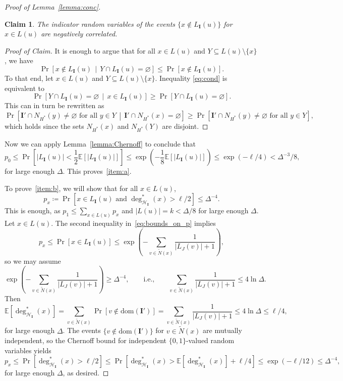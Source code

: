\documentclass[11pt, reqno, psamsfonts]{amsart}
\newtheorem*{claim*}{Claim}
\theoremstyle{definition}
\theoremstyle{remark}
\newcommand*{\myproofname}{Proof}
\newenvironment{claimproof}[1][\myproofname]{\begin{proof}[#1]\renewcommand*{\qedsymbol}{\(\dashv\)}}{\end{proof}}
\renewcommand{\qedsymbol}{$\blacksquare$}
\newcommand{\0}{\varnothing}
\newcommand{\set}[1]{\{#1\}}
\newcommand{\dom}{\mathrm{dom}}
\renewcommand{\tilde}{\widetilde}
\renewcommand{\leq}{\leqslant}
\renewcommand{\geq}{\geqslant}
\newcommand{\defeq}{\coloneqq}
\newcommand{\Cov}[1]{\mathscr{#1}}
\newcommand{\event}[1]{\{{#1}\}}
\renewcommand{\mathbf}[1]{{\bm{#1}}}
\numberwithin{equation}{section}
\begin{document}
\begin{proof}[Proof of Lemma~\ref{lemma:conc}]
	\begin{claim*}
		The indicator random variables of the events $\event{x \not\in L_\mathbf{I}(u)}$ for $x \in L(u)$ are negatively correlated.
	\end{claim*}
	\begin{claimproof}[Proof of Claim]
		It is enough to argue that for all $x \in L(u)$ and $Y \subseteq L(u) \setminus \set{x}$, we have
		\begin{equation}\label{eq:cond}
			\Pr\left[x \not\in L_\mathbf{I}(u) \, \middle\vert\, Y \cap L_\mathbf{I}(u) = \0\right] \leq \Pr\left[x \not\in L_\mathbf{I}(u)\right].
		\end{equation}
		To that end, let $x \in L(u)$ and $Y \subseteq L(u) \setminus \set{x}$. Inequality \eqref{eq:cond} is equivalent to
		\[
			\Pr\left[Y \cap L_\mathbf{I}(u) = \0 \, \middle\vert\, x \in L_\mathbf{I}(u) \right] \geq \Pr\left[Y \cap L_\mathbf{I}(u) = \0\right].
		\]
		This can in turn be rewritten as
		\[
			\Pr\left[\mathbf{I}' \cap N_{H^\ast}(y) \neq \0 \text{ for all } y \in Y \, \middle\vert\, \mathbf{I}' \cap N_{H^\ast}(x) = \0 \right] \geq \Pr\left[\mathbf{I}' \cap N_{H^\ast}(y) \neq \0 \text{ for all } y \in Y\right],
		\]
		which holds since the sets $N_{H^\ast}(x)$ and $N_{H^\ast}(Y)$ are disjoint.
	\end{claimproof}
	
	\noindent Now we can apply Lemma~\ref{lemma:Chernoff} to conclude that
	\[
		p_0  \leq \Pr\left[|L_\mathbf{I}(u)| < \frac{1}{2}\mathbb{E}\left[|L_\mathbf{I}(u)|\right]\right] \leq \exp\left(-\frac{1}{8}\mathbb{E}\left[|L_\mathbf{I}(u)|\right]\right) \leq \exp\left(-\ell/4\right)  < \Delta^{-3}/8,
	\]
	for large enough $\Delta$. This proves~\ref{item:a}.
	
	To prove~\ref{item:b}, we will show that for all $x \in L(u)$,
	\[
		p_x \defeq \Pr\left[x \in L_{\mathbf{I}}(u) \text{ and } \deg^\ast_{\Cov{H}_{\mathbf{I}}}(x) > \ell/2\right] \leq \Delta^{-4}.
	\]
	This is enough, as $p_1 \leq \sum_{x \in L(u)} p_x$ and $|L(u)| = k < \Delta/8$ for large enough $\Delta$. Let $x \in L(u)$. The second inequality in~\eqref{eq:bounds_on_p} implies
	\[
		p_x \leq \Pr\left[x \in L_{\mathbf{I}}(u)\right] \leq \exp\left(-\sum_{v \in \tilde{N}(x)}\frac{1}{|L_J(v)|+1}\right),
	\]
	so we may assume
	\[
		\exp\left(-\sum_{v \in \tilde{N}(x)}\frac{1}{|L_J(v)|+1}\right) \geq \Delta^{-4}, \qquad\text{i.e.,}\qquad \sum_{v \in \tilde{N}(x)}\frac{1}{|L_J(v)|+1} \leq 4\ln \Delta.
	\]
	Then
	\[
		\mathbb{E}\left[\deg^\ast_{\Cov{H}_{\mathbf{I}}}(x)\right] = \sum_{v \in \tilde{N}(x)} \Pr\left[v \not\in \dom(\mathbf{I}')\right] = \sum_{v \in \tilde{N}(x)} \frac{1}{|L_J(v)|+1} \leq 4\ln\Delta \leq \ell/4,
	\]
	for large enough $\Delta$. The events $\event{v \not\in \dom(\mathbf{I}')}$ for $v \in \tilde{N}(x)$ are mutually independent, so the Chernoff bound for independent $\set{0,1}$-valued random variables yields
	\[
		p_x \leq \Pr\left[\deg^\ast_{\Cov{H}_{\mathbf{I}}}(x) > \ell/2\right] \leq \Pr\left[\deg^\ast_{\Cov{H}_{\mathbf{I}}}(x) > \mathbb{E}\left[\deg^\ast_{\Cov{H}_{\mathbf{I}}}(x)\right] + \ell/4\right] \leq \exp\left(-\ell/12\right) \leq \Delta^{-4},
	\]
	for large enough $\Delta$, as desired.
	\end{proof}
\end{document}
